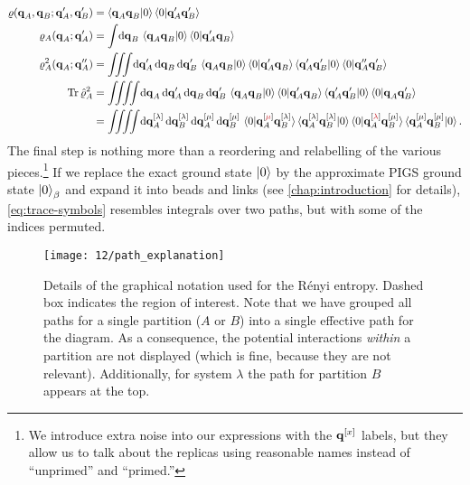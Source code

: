 \begin{subequations} \label{eq:trace}
\begin{align}
	\rho(\vec{q}_A, \vec{q}_B ; \vec{q}_A', \vec{q}_B')
	&= \braket{\vec{q}_A \vec{q}_B | 0} \braket{0 | \vec{q}_A' \vec{q}_B'} \\
	\rho_A(\vec{q}_A; \vec{q}_A')
	&= \int\! \dif \vec{q}_B \, \braket{\vec{q}_A \vec{q}_B | 0} \braket{0 | \vec{q}_A' \vec{q}_B} \\
	\rho_A^2(\vec{q}_A; \vec{q}_A'')
	&= \iiint\! \dif \vec{q}_A' \dif \vec{q}_B \dif \vec{q}_B' \,
			\braket{\vec{q}_A \vec{q}_B | 0} \braket{0 | \vec{q}_A' \vec{q}_B}
			\braket{\vec{q}_A' \vec{q}_B' | 0} \braket{0 | \vec{q}_A'' \vec{q}_B'} \\
	\Tr{\hat{\rho}_A^2}
	&= \iiiint\! \dif \vec{q}_A \dif \vec{q}_A' \dif \vec{q}_B \dif \vec{q}_B' \,
			\braket{\vec{q}_A \vec{q}_B | 0} \braket{0 | \vec{q}_A' \vec{q}_B}
			\braket{\vec{q}_A' \vec{q}_B' | 0} \braket{0 | \vec{q}_A \vec{q}_B'} \\
	&= \iiiint\! \dif \vec{q}_A\sys{\lambda} \dif \vec{q}_B\sys{\lambda} \dif \vec{q}_A\sys{\mu} \dif \vec{q}_B\sys{\mu} \,
			\braket{0 | \vec{q}_A\sys{\red{\mu}} \vec{q}_B\sys{\lambda}} \braket{\vec{q}_A\sys{\lambda} \vec{q}_B\sys{\lambda} | 0}
			\braket{0 | \vec{q}_A\sys{\red{\lambda}} \vec{q}_B\sys{\mu}} \braket{\vec{q}_A\sys{\mu} \vec{q}_B\sys{\mu} | 0}.
				\label{eq:trace-symbols}
\end{align}
\end{subequations}
The final step is nothing more than a reordering and relabelling of the various pieces.\footnote{
	We introduce extra noise into our expressions with the $\bm{\mathbf{q}}^{[x]}$ labels, but they allow us to talk about the replicas using reasonable names instead of ``unprimed'' and ``primed.''
}
If we replace the exact ground state $\ket{0}$ by the approximate PIGS ground state $\ket{0}_\beta$ and expand it into beads and links (see \cref{chap:introduction} for details), \cref{eq:trace-symbols} resembles integrals over two paths, but with some of the indices permuted.

\begin{figure}
	\centering
	\texttt{[image: 12/path\_explanation]}
	\caption[
		Graphical notation for Rényi entropy
	]{
		Details of the graphical notation used for the Rényi entropy.
		Dashed box indicates the region of interest.
		Note that we have grouped all paths for a single partition ($A$ or $B$) into a single effective path for the diagram.
		As a consequence, the potential interactions \emph{within} a partition are not displayed (which is fine, because they are not relevant).
		Additionally, for system $\lambda$ the path for partition $B$ appears at the top.
	}
	\label{fig:renyi-path-explanation}
\end{figure}

